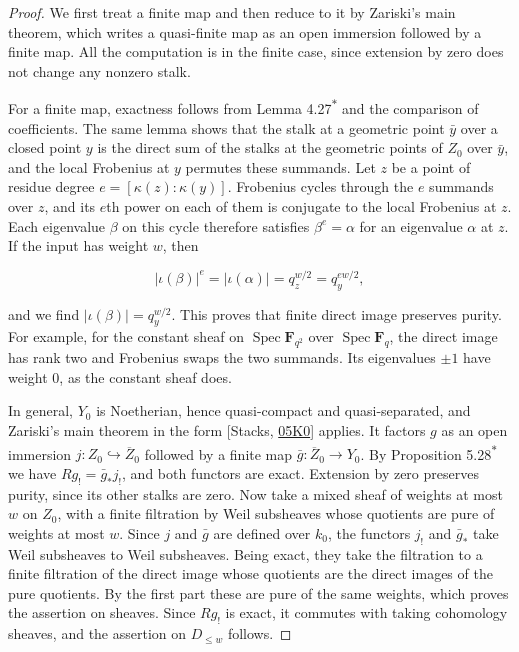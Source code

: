 \documentclass[11pt]{article}
\newcommand{\bpout}[1]{#1\textsuperscript{\hyperlink{bp-outside}{\ensuremath{\ast}}}}
\begin{document}
\begin{proof}[{Proof}]\label{bp6}%
We first treat a finite map and then reduce to it by Zariski's main theorem, which writes a quasi-finite map as an open immersion followed by a finite map. All the computation is in the finite case, since extension by zero does not change any nonzero stalk.

For a finite map, exactness follows from Lemma \bpout{4.27} and the comparison of coefficients. The same lemma shows that the stalk at a geometric point \(\bar y\) over a closed point \(y\) is the direct sum of the stalks at the geometric points of \(Z_0\) over \(\bar y\), and the local Frobenius at \(y\) permutes these summands. Let \(z\) be a point of residue degree \(e=[\kappa(z):\kappa(y)]\). Frobenius cycles through the \(e\) summands over \(z\), and its \(e\)th power on each of them is conjugate to the local Frobenius at \(z\). Each eigenvalue \(\beta\) on this cycle therefore satisfies \(\beta^e=\alpha\) for an eigenvalue \(\alpha\) at \(z\). If the input has weight \(w\), then

\[
|\iota(\beta)|^e=|\iota(\alpha)|=q_z^{w/2}=q_y^{ew/2},
\]

and we find \(|\iota(\beta)|=q_y^{w/2}\). This proves that finite direct image preserves purity. For example, for the constant sheaf on \(\operatorname{Spec}\mathbf F_{q^2}\) over \(\operatorname{Spec}\mathbf F_q\), the direct image has rank two and Frobenius swaps the two summands. Its eigenvalues \(\pm1\) have weight \(0\), as the constant sheaf does.

In general, \(Y_0\) is Noetherian, hence quasi-compact and quasi-separated, and Zariski's main theorem in the form [Stacks, \href{https://stacks.math.columbia.edu/tag/05K0}{05K0}] applies. It factors \(g\) as an open immersion \(j:Z_0\hookrightarrow\overline Z_0\) followed by a finite map \(\bar g:\overline Z_0\to Y_0\). By Proposition \bpout{5.28} we have \(Rg_!=\bar g_*j_!\), and both functors are exact. Extension by zero preserves purity, since its other stalks are zero. Now take a mixed sheaf of weights at most \(w\) on \(Z_0\), with a finite filtration by Weil subsheaves whose quotients are pure of weights at most \(w\). Since \(j\) and \(\bar g\) are defined over \(k_0\), the functors \(j_!\) and \(\bar g_*\) take Weil subsheaves to Weil subsheaves. Being exact, they take the filtration to a finite filtration of the direct image whose quotients are the direct images of the pure quotients. By the first part these are pure of the same weights, which proves the assertion on sheaves. Since \(Rg_!\) is exact, it commutes with taking cohomology sheaves, and the assertion on \(D_{\leq w}\) follows.
\end{proof}
\end{document}

